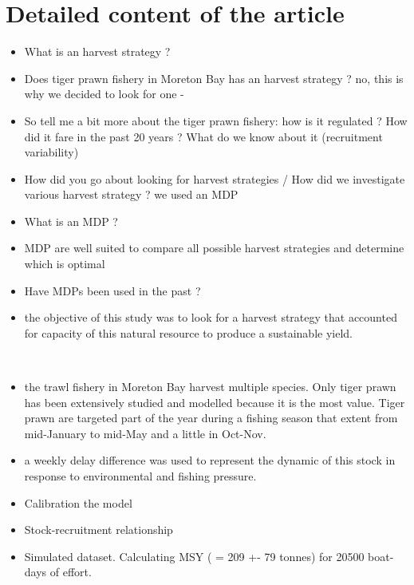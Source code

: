 \documentclass[11pt]{article}
\begin{document}
\clearpage
\newpage
\section{Detailed content of the article}


\begin{itemize}

\item What is an harvest strategy ?
\item Does tiger prawn fishery in Moreton Bay has an harvest strategy ? no, this is why we decided to look for one -
\item So tell me a bit more about the tiger prawn fishery: how is it regulated ? How did it fare in the past 20 years ? What do we know about it (recruitment variability)

\item How did you go about looking for harvest strategies / How did we investigate various harvest strategy ? we used an MDP 
\item What is an MDP ?
\item MDP are well suited to compare all possible harvest strategies and determine which is optimal
\item Have MDPs been used in the past ?

\item the objective of this study was to look for a harvest strategy that accounted for capacity of this natural resource to produce a sustainable yield.

\end{itemize}

\\


\begin{itemize}
\item the trawl fishery in Moreton Bay harvest multiple species. Only tiger prawn has been extensively studied and modelled because it is the most value. Tiger prawn are targeted part of the year during a fishing season that extent from mid-January to mid-May and a little in Oct-Nov.
\item a weekly delay difference was used to represent the dynamic of this stock in response to environmental and fishing pressure.
\item Calibration the model
\item Stock-recruitment relationship
\item Simulated dataset. Calculating MSY ( = 209 +- 79 tonnes) for 20500 boat-days of effort.
\end{itemize}
\end{document}
